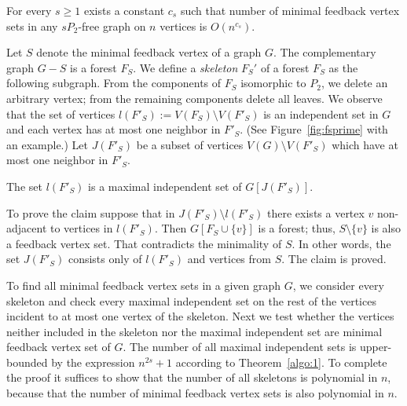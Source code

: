 \begin{lemma}\label{algo:feedbackpoly}
	For every \(s \geq 1\) exists a constant \(c_s\) such that number of minimal feedback vertex sets in any \(sP_2\)-free graph on \(n\) vertices is \(O(n^{c_s})\).
\end{lemma}

\begin{myproof}
	Let \(S\) denote the minimal feedback vertex of a graph \(G\).
	The complementary graph \(G - S\) is a forest \(F_S\).
	We define a \emph{skeleton} \(F_S'\) of a forest \(F_S\) as the following subgraph. 
	From the components of \(F_S\) isomorphic to \(P_2\), we delete an arbitrary vertex; from the remaining components delete all leaves. 
	We observe that the set of vertices \(l(F'_S) := V(F_S) \setminus V(F'_S)\) is an independent set in \(G\) and each vertex has at most one neighbor in \(F'_S\).
	(See Figure~\ref{fig:fsprime} with an example.)
	Let \(J(F'_S)\) be a subset of vertices \(V(G) \setminus V(F'_S)\) which have at most one neighbor in \(F'_S\).
	\begin{claim}
		The set \(l(F'_S)\) is a maximal independent set of \(G[J(F'_S)]\).
	\end{claim}
	To prove the claim suppose that in \(J(F'_S) \setminus l(F'_S)\) there exists a vertex \(v\) non-adjacent to vertices in \(l(F'_S)\). 
	Then \(G[F_S \cup \{v\}]\) is a forest; thus, \(S \setminus \{v\} \) is also a feedback vertex set. That contradicts the minimality of \(S\).
	In other words, the set \(J(F'_S)\) consists only of \(l(F'_S)\) and vertices from \(S\). The claim is proved.

	To find all minimal feedback vertex sets in a given graph \(G\), 
	we consider every skeleton and check every maximal independent set on the rest of the vertices incident to at most one vertex of the skeleton.
	Next we test whether the vertices neither included in the skeleton nor the maximal independent set are minimal feedback vertex set of \(G\).
	The number of all maximal independent sets is upper-bounded by the expression \(n^{2s} + 1\) according to Theorem~\ref{algo:1}. 
	To complete the proof it suffices to show that the number of all skeletons is polynomial in \(n\), 
	because  that the number of minimal feedback vertex sets is also polynomial in \(n\).
	

\end{myproof}
